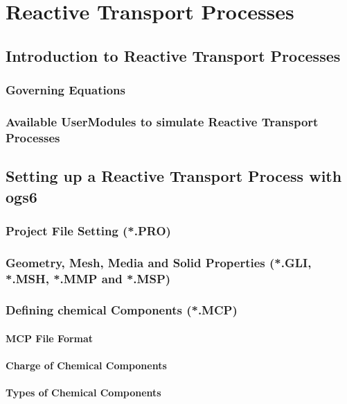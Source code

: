 \chapter{Reactive Transport Processes}

\section{Introduction to Reactive Transport Processes}

\subsection{Governing Equations}

\subsection{Available UserModules to simulate Reactive Transport Processes}

\section{Setting up a Reactive Transport Process with ogs6}

\subsection{Project File Setting (*.PRO)}

\subsection{Geometry, Mesh, Media and Solid Properties (*.GLI, *.MSH, *.MMP and *.MSP)}

\subsection{Defining chemical Components (*.MCP)}

\subsubsection{MCP File Format}

\subsubsection{Charge of Chemical Components}

\subsubsection{Types of Chemical Components}


